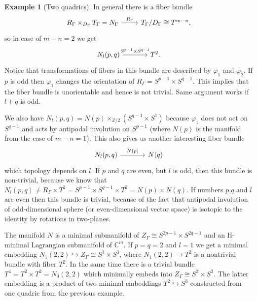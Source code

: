 \documentclass[jsg]{IP_v1_forauthors}
\theoremstyle{definition}
\numberwithin{equation}{section}
\newtheorem{exam}{Example}
\begin{document}
\begin{exam}[Two quadrics]
In general there is a fiber bundle
\begin{equation}
\begin{tikzcd}
R_\Gamma \times_{D_\Gamma} T_\Gamma = N_\Gamma \arrow[rightarrow]{r}{R_\Gamma}
  & T_\Gamma/D_\Gamma \cong T^{m-n},
\end{tikzcd}
\end{equation}
so in case of $m-n=2$ we get
\begin{equation}
\begin{tikzcd}[column sep=large]
N_l(p,q) \arrow[rightarrow]{r}{S^{p-1} \times S^{q-1}}
  & T^{2}.
\end{tikzcd}
\end{equation}
Notice that transformations of fibers in this bundle are described by $\varphi_1$ and $\varphi_2$. If $p$ is odd then $\varphi_1$ changes the orientation of $R_\Gamma = S^{p-1} \times S^{q-1}$. This implies that the fiber bundle is unorientable and hence is not trivial. Same argument works if $l+q$ is odd.

We also have $N_l (p,q) =N(p)\times_{{\mathbb Z}/2} (S^{q-1} \times S^1) $ because $\varphi_1$ does not act on $S^{q-1}$ and acts by antipodal involution on $S^{p-1}$
(where $N(p)$ is the manifold from the case of $m-n=1$). This also gives us another interesting fiber bundle
\begin{equation}
\begin{tikzcd}[column sep=large]
N_l(p,q) \arrow[rightarrow]{r}{N(p)}
  & N(q)
\end{tikzcd}
\end{equation}
which topology depends on $l$. If $p$ and $q$ are even, but $l$ is odd, then this bundle is non-trivial, because we know that $N_l(p,q) \neq R_\Gamma \times T^2 = S^{p-1} \times S^{q-1} \times T^2 = N(p) \times N(q)$. If numbers $p$,$q$ and $l$ are even then this bundle is trivial, because of the fact that antipodal involution of odd-dimensional sphere (or even-dimensional vector space) is isotopic to the identity by rotations in two-planes.

The manifold $N$ is a minimal submanifold of $Z_\Gamma \cong S^{2p-1} \times S^{2q-1}$ and an H-minimal Lagrangian submanifold of ${\mathbb C}^m$. If $p=q=2$ and $l=1$ we get a minimal embedding $N_1(2,2)\hookrightarrow Z_\Gamma \cong S^{3} \times S^{3}$, where $N_1(2,2)\rightarrow T^2$ is a nontrivial bundle with fiber $T^2$. In the same time there is a trivial bundle $T^4=T^2\times T^2=N_0(2,2)$ which minimally embeds into $Z_\Gamma \cong S^{3} \times S^{3}$. The latter embedding is a product of two minimal embeddings $T^2 \hookrightarrow S^3$ constructed from one quadric from the previous example.
\end{exam}
\end{document}
